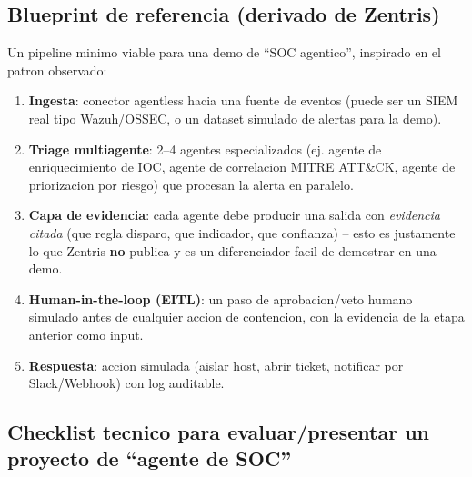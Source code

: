 \documentclass[11pt,a4paper]{article}
\begin{document}
\subsection{Blueprint de referencia (derivado de Zentris)}

Un pipeline minimo viable para una demo de ``SOC agentico'', inspirado en el patron observado:

\begin{enumerate}[leftmargin=1.4em]
  \item \textbf{Ingesta}: conector agentless hacia una fuente de eventos (puede ser un SIEM
  real tipo Wazuh/OSSEC, o un dataset simulado de alertas para la demo).
  \item \textbf{Triage multiagente}: 2--4 agentes especializados (ej. agente de
  enriquecimiento de IOC, agente de correlacion MITRE ATT\&CK, agente de priorizacion por
  riesgo) que procesan la alerta en paralelo.
  \item \textbf{Capa de evidencia}: cada agente debe producir una salida con \emph{evidencia
  citada} (que regla disparo, que indicador, que confianza) -- esto es justamente lo que
  Zentris \textbf{no} publica y es un diferenciador facil de demostrar en una demo.
  \item \textbf{Human-in-the-loop (EITL)}: un paso de aprobacion/veto humano simulado antes de
  cualquier accion de contencion, con la evidencia de la etapa anterior como input.
  \item \textbf{Respuesta}: accion simulada (aislar host, abrir ticket, notificar por
  Slack/Webhook) con log auditable.
\end{enumerate}

\subsection{Checklist tecnico para evaluar/presentar un proyecto de ``agente de SOC''}
\end{document}
